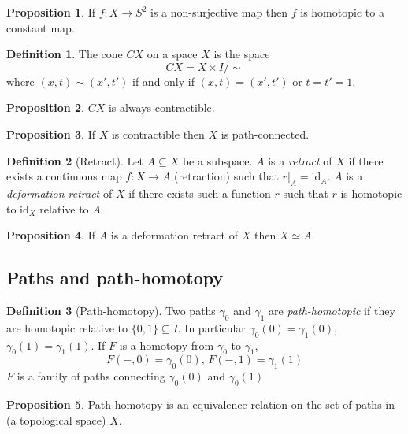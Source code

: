 \documentclass[a4paper,14pt]{extarticle}
\theoremstyle{definition}
\newtheorem*{definition}{Definition}
\newtheorem*{proposition}{Proposition}
\begin{document}
\begin{proposition}
  If $f:X\rightarrow S^2$ is a non-surjective map then $f$ is homotopic to a constant 
  map.
\end{proposition}

\begin{definition}
  The cone $CX$ on a space $X$ is the space
  \[CX=X\times I/\sim\] where $(x,t)\sim(x',t')$ if and only if $(x,t)=(x',t')$ or 
  $t=t'=1$.
\end{definition}

\begin{proposition}
  $CX$ is always contractible.
\end{proposition}

\begin{proposition}
  If $X$ is contractible then $X$ is path-connected.
\end{proposition}

\begin{definition}[Retract]
  Let $A\subseteq X$ be a subspace. $A$ is a \emph{retract} of $X$ if there exists a continuous map $f:X\rightarrow A$ (retraction) such that $r|_A=\text{id}_A$. $A$ is a \emph{deformation
  retract} of $X$ if there exists such a function $r$ such that $r$ is homotopic to 
  $\text{id}_X$ relative to $A$.
\end{definition}

\begin{proposition}
  If $A$ is a deformation retract of $X$ then $X\simeq A$.
\end{proposition}

\subsection{Paths and path-homotopy}

\begin{definition}[Path-homotopy]
  Two paths $\gamma_0$ and $\gamma_1$ are \emph{path-homotopic} if they are homotopic 
  relative to $\{0,1\}\subseteq I$. In particular $\gamma_0(0)=\gamma_1(0)$, 
  $\gamma_0(1)=\gamma_1(1)$. If $F$ is a homotopy from $\gamma_0$ to $\gamma_1$,
  \[F(-,0)=\gamma_0(0), \,F(-,1)=\gamma_1(1)\] $F$ is a family of paths connecting 
  $\gamma_0(0)$ and $\gamma_0(1)$
\end{definition}

\begin{proposition}
  Path-homotopy is an equivalence relation on the set of paths in (a topological space) $X$.
\end{proposition}
\end{document}
